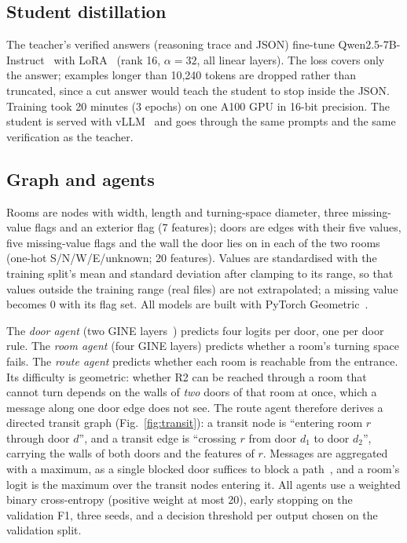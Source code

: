 \documentclass[conference]{IEEEtran}
\begin{document}
\subsection{Student distillation}

The teacher's verified answers (reasoning trace and JSON) fine-tune Qwen2.5-7B-Instruct~\cite{qwen2025} with
LoRA~\cite{hu2022lora} (rank 16, $\alpha=32$, all linear layers). The loss covers only the answer; examples longer
than 10,240 tokens are dropped rather than truncated, since a cut answer would teach the student to stop inside the
JSON. Training took 20 minutes (3 epochs) on one A100 GPU in 16-bit precision. The student is served with
vLLM~\cite{kwon2023vllm} and goes through the same prompts and the same verification as the teacher.

\subsection{Graph and agents}

Rooms are nodes with width, length and turning-space diameter, three missing-value flags and an exterior flag
(7 features); doors are edges with their five values, five missing-value flags and the wall the door lies on in
each of the two rooms (one-hot S/N/W/E/unknown; 20 features). Values are standardised with the training split's
mean and standard deviation after clamping to its range, so that values outside the training range (real files) are
not extrapolated; a missing value becomes 0 with its flag set. All models are built with PyTorch
Geometric~\cite{fey2019pyg}.

The \emph{door agent} (two GINE layers~\cite{xu2019gin,hu2020gine}) predicts four logits per door, one per door
rule. The \emph{room agent} (four GINE layers) predicts whether a room's turning space fails. The \emph{route agent}
predicts whether each room is reachable from the entrance. Its difficulty is geometric: whether R2 can be reached
through a room that cannot turn depends on the walls of \emph{two} doors of that room at once, which a message along
one door edge does not see. The route agent therefore derives a directed transit graph (Fig.~\ref{fig:transit}):
a transit node is ``entering room $r$ through door $d$'', and a transit edge is ``crossing $r$ from door $d_1$ to door
$d_2$'', carrying the walls of both doors and the features of $r$. Messages are aggregated with a maximum, as a
single blocked door suffices to block a path~\cite{gilmer2017}, and a room's logit is the maximum over the transit
nodes entering it. All agents use a weighted binary cross-entropy (positive weight at most 20), early stopping on
the validation F1, three seeds, and a decision threshold per output chosen on the validation split.
\end{document}

